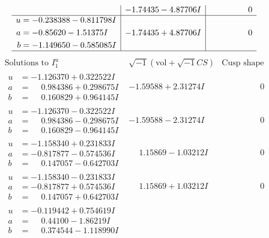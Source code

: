 \documentclass[1p]{elsarticle_modified}
\theoremstyle{definition}
\newcommand{\I}{\sqrt{-1}}
\begin{document}
$$\begin{array}{c|c|c}
 & -1.74435 - 4.87706 I & \phantom{-0.000000 } 0 \\ \hline\begin{aligned}
u &= -0.238388 - 0.811798 I \\
a &= -0.85620 - 1.51375 I \\
b &= -1.149650 - 0.585085 I\end{aligned}
 & -1.74435 + 4.87706 I & \phantom{-0.000000 } 0\\
 \hline 
 \end{array}$$\newpage$$\begin{array}{c|c|c}  
\text{Solutions to }I^u_{1}& \I (\text{vol} + \sqrt{-1}CS) & \text{Cusp shape}\\
 \hline 
\begin{aligned}
u &= -1.126370 + 0.322522 I \\
a &= \phantom{-}0.984386 + 0.298675 I \\
b &= \phantom{-}0.160829 + 0.964145 I\end{aligned}
 & -1.59588 + 2.31274 I & \phantom{-0.000000 } 0 \\ \hline\begin{aligned}
u &= -1.126370 - 0.322522 I \\
a &= \phantom{-}0.984386 - 0.298675 I \\
b &= \phantom{-}0.160829 - 0.964145 I\end{aligned}
 & -1.59588 - 2.31274 I & \phantom{-0.000000 } 0 \\ \hline\begin{aligned}
u &= -1.158340 + 0.231833 I \\
a &= -0.817877 - 0.574536 I \\
b &= \phantom{-}0.147057 - 0.642703 I\end{aligned}
 & \phantom{-}1.15869 - 1.03212 I & \phantom{-0.000000 } 0 \\ \hline\begin{aligned}
u &= -1.158340 - 0.231833 I \\
a &= -0.817877 + 0.574536 I \\
b &= \phantom{-}0.147057 + 0.642703 I\end{aligned}
 & \phantom{-}1.15869 + 1.03212 I & \phantom{-0.000000 } 0 \\ \hline\begin{aligned}
u &= -0.119442 + 0.754619 I \\
a &= \phantom{-}0.44100 - 1.86219 I \\
b &= \phantom{-}0.374544 - 1.118990 I\end{aligned}

\end{array}$$
\end{document}
